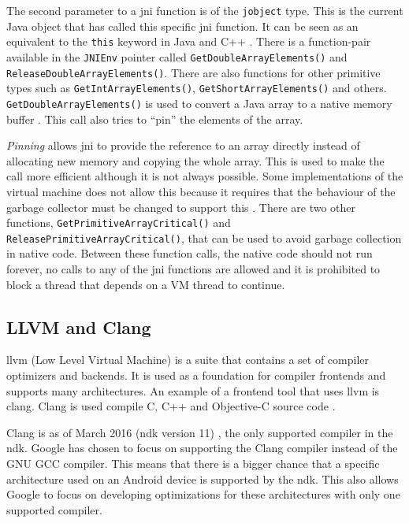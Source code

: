 The second parameter to a \gls{jni} function is of the \texttt{jobject} type. This is the current Java object that has called this specific \gls{jni} function. It can be seen as an equivalent to the \texttt{this} keyword in Java and C++ \cite[p.~23]{liang1999java}. There is a function-pair available in the \texttt{JNIEnv} pointer called \texttt{GetDoubleArrayElements()} and \texttt{ReleaseDoubleArrayElements()}. There are also functions for other primitive types such as \texttt{GetIntArrayElements()}, \texttt{GetShortAr\-rayElements()} and others. \texttt{GetDoubleArrayElements()} is used to convert a Java array to a native memory buffer \cite[p.~159]{liang1999java}. This call also tries to \enquote{pin} the elements of the array.

\emph{Pinning} allows \gls{jni} to provide the reference to an array directly instead of allocating new memory and copying the whole array. This is used to make the call more efficient although it is not always possible. Some implementations of the virtual machine does not allow this because it requires that the behaviour of the garbage collector must be changed to support this \cite[p.~158]{liang1999java}. There are two other functions, \texttt{GetPrimitiveArrayCritical()} and \texttt{ReleasePrimitiveArrayCritical()}, that can be used to avoid garbage collection in native code. Between these function calls, the native code should not run forever, no calls to any of the \gls{jni} functions are allowed and it is prohibited to block a thread that depends on a VM thread to continue.

\subsection{LLVM and Clang}
\gls{llvm} (Low Level Virtual Machine) is a suite that contains a set of compiler optimizers and backends. It is used as a foundation for compiler frontends and supports many architectures. An example of a frontend tool that uses \gls{llvm} is \gls{clang}. Clang is used compile C, C++ and Objective-C source code \cite{clang:comp}.

Clang is as of March 2016 (\gls{ndk} version 11) \cite{android:ndk:revision}, the only supported compiler in the \gls{ndk}. Google has chosen to focus on supporting the Clang compiler instead of the GNU GCC compiler. This means that there is a bigger chance that a specific architecture used on an Android device is supported by the \gls{ndk}. This also allows Google to focus on developing optimizations for these architectures with only one supported compiler.

